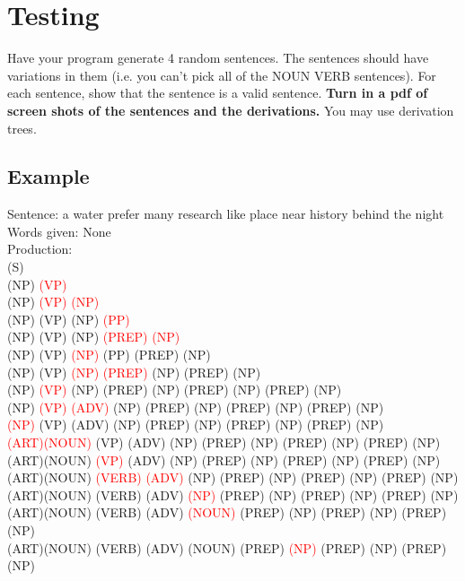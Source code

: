 \documentclass[11pt]{article}
\begin{document}
\newpage
\section*{Testing}
Have your program generate 4 random sentences. The sentences should
have variations in them (i.e.  you can't pick all of the NOUN VERB
sentences).  For each sentence, show that the sentence is a valid sentence. \textbf{Turn in a
  pdf of screen shots of the sentences and the derivations.} You may use derivation trees.

\subsection*{Example}
Sentence: a water prefer many research like place near history behind the night\\
Words given: None\\
Production:\\
(S)\\
(NP) \textcolor{red}{(VP)}\\
(NP) \textcolor{red}{(VP) (NP)}\\
(NP) (VP) (NP) \textcolor{red}{(PP)}\\
(NP) (VP) (NP) \textcolor{red}{(PREP) (NP)}\\
(NP) (VP) \textcolor{red}{(NP)} (PP) (PREP) (NP)\\
(NP) (VP) \textcolor{red}{(NP) (PREP)} (NP) (PREP) (NP)\\
(NP) \textcolor{red}{(VP)} (NP) (PREP) (NP) (PREP) (NP) (PREP) (NP)\\
(NP) \textcolor{red}{(VP) (ADV)} (NP) (PREP) (NP) (PREP) (NP) (PREP) (NP)\\
\textcolor{red}{(NP)} (VP) (ADV) (NP) (PREP) (NP) (PREP) (NP) (PREP) (NP)\\
\textcolor{red}{(ART)(NOUN)} (VP) (ADV) (NP) (PREP) (NP) (PREP) (NP) (PREP) (NP)\\
(ART)(NOUN)\textcolor{red}{ (VP)} (ADV) (NP) (PREP) (NP) (PREP) (NP) (PREP) (NP)\\
(ART)(NOUN) \textcolor{red}{(VERB) (ADV)} (NP) (PREP) (NP) (PREP) (NP) (PREP) (NP)\\
(ART)(NOUN) (VERB) (ADV)\textcolor{red}{ (NP)} (PREP) (NP) (PREP) (NP) (PREP) (NP)\\
(ART)(NOUN) (VERB) (ADV) \textcolor{red}{(NOUN)} (PREP) (NP) (PREP) (NP) (PREP) (NP)\\
(ART)(NOUN) (VERB) (ADV) (NOUN) (PREP) \textcolor{red}{(NP)} (PREP) (NP) (PREP) (NP)\\
\end{document}

